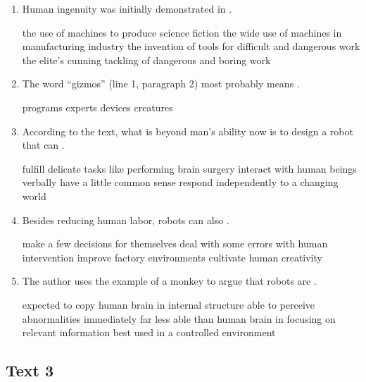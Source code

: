 \begin{enumerate}[resume]
	\item
Human ingenuity was initially demonstrated in \lineread.


\fourchoices
{the use of machines to produce science fiction}
{the wide use of machines in manufacturing industry}
{the invention of tools for difficult and dangerous work}
{the elite's cunning tackling of dangerous and boring work}


\item
 The word ``gizmos'' (line 1, paragraph 2) most probably
means \lineread.



\fourchoices
{programs}
{experts}
{devices}
{creatures}




\item
According to the text, what is beyond man's ability now is to design
a robot that can \lineread.


\fourchoices
{fulfill delicate tasks like performing brain surgery}
{interact with human beings verbally}
{have a little common sense}
{respond independently to a changing world}


\item
Besides reducing human labor, robots can also \lineread.


\fourchoices
{make a few decisions for themselves}
{deal with some errors with human intervention}
{improve factory environments}
{cultivate human creativity}


\item
The author uses the example of a monkey to argue that robots are \lineread.


\fourchoices
{expected to copy human brain in internal structure}
{able to perceive abnormalities immediately}
{far less able than human brain in focusing on relevant information}
{best used in a controlled environment}

\end{enumerate}


\newpage
\subsection{Text 3}


